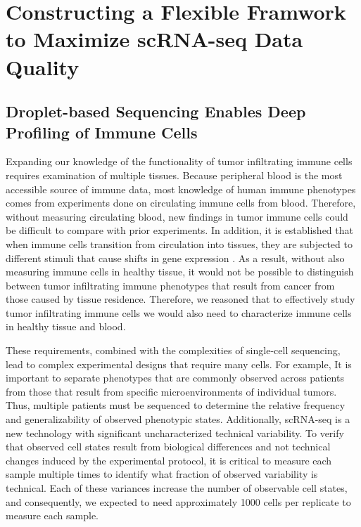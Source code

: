 \chapter[Constructing a Flexible Framwork to Maximize scRNA-seq Data Quality][Constructing a Flexible Framwork to Maximize scRNA-seq Data Quality]{Constructing a Flexible Framwork to Maximize scRNA-seq Data Quality}

\section{Droplet-based Sequencing Enables Deep Profiling of Immune Cells}


Expanding our knowledge of the functionality of tumor infiltrating immune cells requires examination of multiple tissues.
Because peripheral blood is the most accessible source of immune data, most knowledge of human immune phenotypes comes from experiments done on circulating immune cells from blood.
Therefore, without measuring circulating blood, new findings in tumor immune cells could be difficult to compare with prior experiments. 
In addition, it is established that when immune cells transition from circulation into tissues, they are subjected to different stimuli that cause shifts in gene expression \citep{Fan2016}. 
As a result, without also measuring immune cells in healthy tissue, it would not be possible to distinguish between tumor infiltrating immune phenotypes that result from cancer from those caused by tissue residence. 
Therefore, we reasoned that to effectively study tumor infiltrating immune cells we would also need to characterize immune cells in healthy tissue and blood.

These requirements, combined with the complexities of single-cell sequencing, lead to complex experimental designs that require many cells. 
For example, It is important to separate phenotypes that are commonly observed across patients from those that result from specific microenvironments of individual tumors. 
Thus, multiple patients must be sequenced to determine the relative frequency and generalizability of observed phenotypic states. 
Additionally, scRNA-seq is a new technology with significant uncharacterized technical variability. 
To verify that observed cell states result from biological differences and not technical changes induced by the experimental protocol, it is critical to measure each sample multiple times to identify what fraction of observed variability is technical. 
Each of these variances increase the number of observable cell states, and consequently, we expected to need approximately 1000 cells per replicate to measure each sample. 

